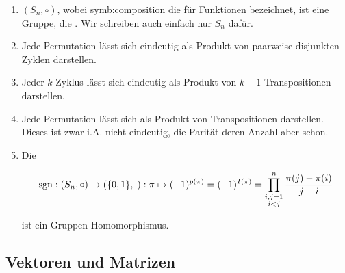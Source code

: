             \begin{lemma} \label{lem:permutations}

                \begin{enumerate}[
                    label = \arabic*.,
                    wide,
                    labelindent = 0pt
                ]

                    \item $(S_n, \circ)$, wobei \gls{symb:composition} die  für Funktionen bezeichnet, ist eine Gruppe, die .
                    Wir schreiben auch einfach nur $S_n$ dafür.

                    \item Jede Permutation lässt sich eindeutig als Produkt von paarweise disjunkten Zyklen darstellen.

                    \item Jeder $k$-Zyklus lässt sich eindeutig als Produkt von $k - 1$ Transpositionen darstellen.

                    \item Jede Permutation lässt sich als Produkt von Transpositionen darstellen.
                    Dieses ist zwar i.A. nicht eindeutig, die Parität deren Anzahl aber schon.

                    \item Die 

                    \begin{align*}
                        \operatorname{sgn}:
                            (S_n, \circ) \to ({\left \{ 0, 1 \right \}}, \cdot):
                            \pi
                            \mapsto
                            (-1)^{p(\pi)}
                            =
                            (-1)^{I(\pi)}
                            =
                            \prod_{\substack{i,j=1 \\ i<j}}^n
                                \frac{\pi(j) - \pi(i)}{j - i}
                    \end{align*}

                    ist ein Gruppen-Homomorphismus.

                \end{enumerate}

            \end{lemma}

        \subsection{Vektoren und Matrizen}

